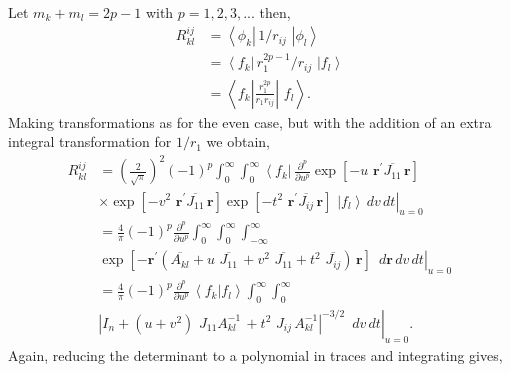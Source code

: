 \documentclass[12pt]{article}
\begin{document}
Let $m_{k}+m_{l}=2p-1$ with $p=1,2,3,...$ then,
\begin{align}
R_{kl}^{ij} &  =\left\langle \phi_{k}\right|  \,1/r_{ij}\,\mathbf{\,}\left|
\phi_{l}\right\rangle \nonumber\\
&  =\left\langle f_{k}\right|  \,r_{1}^{2p-1}/r_{ij}\,\mathbf{\,}\left|
f_{l}\right\rangle \nonumber\\
&  =\left\langle f_{k}\left|  \frac{r_{1}^{2p}}{r_{1}r_{ij}}\right|
\,\mathbf{\,}f_{l}\right\rangle .
\end{align}
Making transformations as for the even case, but with the addition of an extra
integral transformation for $1/r_{1}$ we obtain,%
\begin{align}
R_{kl}^{ij} &  =\left(  \frac{2}{\sqrt{\pi}}\right)  ^{2}\left(  -1\right)
^{p}\int_{0}^{\infty}\int_{0}^{\infty}\left\langle f_{k}\right|
\,\frac{\partial^{p}}{\partial u^{p}}\exp\left[  -u\,\,\mathbf{r}^{\prime
}\overline{J_{11}}\,\mathbf{r}\right]  \nonumber\\
&  \times\left.  \exp\left[  -v^{2}\,\,\mathbf{r}^{\prime}\overline{J_{11}%
}\,\mathbf{r}\right]  \exp\left[  -t^{2}\,\,\mathbf{r}^{\prime}\overline
{J_{ij}}\,\mathbf{r}\right]  \,\mathbf{\,}\left|  f_{l}\right\rangle
\,dv\,dt\right|  _{u=0}\nonumber\\
&  =\frac{4}{\pi}\left(  -1\right)  ^{p}\frac{\partial^{p}}{\partial u^{p}%
}\int_{0}^{\infty}\int_{0}^{\infty}\int_{-\infty}^{\infty}\nonumber\\
&  \left.  \exp\left[  -\mathbf{r}^{\prime}\left(  \overline{A_{kl}%
}+u\,\,\overline{J_{11}}\,+v^{2}\,\,\overline{J_{11}}+t^{2}\,\,\overline
{J_{ij}}\right)  \,\mathbf{r}\right]  \,\mathbf{\,}\,d\mathbf{r}%
\,dv\,dt\right|  _{u=0}\nonumber\\
&  =\frac{4}{\pi}\left(  -1\right)  ^{p}\frac{\partial^{p}}{\partial u^{p}%
}\,\left\langle f_{k}\right.  |\left.  f_{l}\right\rangle \int_{0}^{\infty
}\int_{0}^{\infty}\nonumber\\
&  \left.  \left|  I_{n}+\left(  u+v^{2}\right)  \,\,J_{11}A_{kl}^{-1}%
\,+t^{2}\,\,J_{ij}\,A_{kl}^{-1}\right|  ^{-3/2}\mathbf{\,}\,\,dv\,dt\right|
_{u=0}.
\end{align}
Again, reducing the determinant to a polynomial in traces and integrating
gives,
\end{document}
